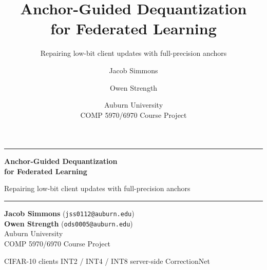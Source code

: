 \documentclass[aspectratio=169,11pt]{beamer}
\title{Anchor-Guided Dequantization\\for Federated Learning}
\subtitle{Repairing low-bit client updates with full-precision anchors}
\author{Jacob Simmons \and Owen Strength}
\date{Auburn University\\COMP 5970/6970 Course Project}
\begin{document}
\begin{frame}[plain]
  \vspace{1.0em}
  {\color{anchorblue}\rule{\textwidth}{2pt}}

  \vspace{0.9em}
  {\LARGE\bfseries Anchor-Guided Dequantization}\\[0.25em]
  {\Large\bfseries for Federated Learning}

  \vspace{0.5em}
  {\large Repairing low-bit client updates with full-precision anchors}

  \vspace{1.1em}
  {\color{anchorblue!65}\rule{\textwidth}{0.8pt}}

  \vspace{1.0em}
  \textbf{Jacob Simmons} (\texttt{jss0112@auburn.edu})\\
  \textbf{Owen Strength} (\texttt{ods0005@auburn.edu})\\
  Auburn University\\
  COMP 5970/6970 Course Project

  \vfill
  \small
  \textcolor{textgray}{CIFAR-10  clients \quad INT2 / INT4 / INT8 \quad server-side CorrectionNet}
\end{frame}
\end{document}
